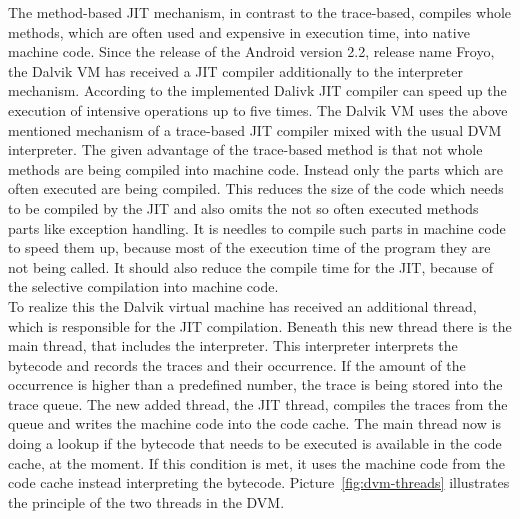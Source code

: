 The method-based JIT mechanism, in contrast to the trace-based, compiles whole methods, which are often used and expensive in execution time, into native machine code.
Since the release of the Android version 2.2, release name Froyo, the Dalvik VM has received a JIT compiler additionally to the interpreter mechanism.
According to \cite{cheng2010jit} the implemented Dalivk JIT compiler can speed up the execution of intensive operations up to five times.
The Dalvik VM uses the above mentioned mechanism of a trace-based JIT compiler mixed with the usual DVM interpreter.
The given advantage of the trace-based method is that not whole methods are being compiled into machine code.
Instead only the parts which are often executed are being compiled.
This reduces the size of the code which needs to be compiled by the JIT and also omits the not so often executed methods parts like exception handling.
It is needles to compile such parts in machine code to speed them up, because most of the execution time of the program they are not being called.
It should also reduce the compile time for the JIT, because of the selective compilation into machine code.\\
To realize this the Dalvik virtual machine has received an additional thread, which is responsible for the JIT compilation.
Beneath this new thread there is the main thread, that includes the interpreter.
This interpreter interprets the bytecode and records the traces and their occurrence.
If the amount of the occurrence is higher than a predefined number, the trace is being stored into the trace queue.
The new added thread, the JIT thread, compiles the traces from the queue and writes the machine code into the code cache.
The main thread now is doing a lookup if the bytecode that needs to be executed is available in the code cache, at the moment.
If this condition is met, it uses the machine code from the code cache instead interpreting the bytecode.\cite{oh2012evaluation}
Picture~\ref{fig:dvm-threads} illustrates the principle of the two threads in the DVM.\\
